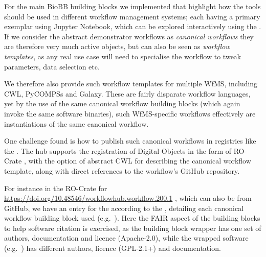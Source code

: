 For the main BioBB building blocks we implemented
 that highlight how the tools should be used in different
workflow management systems; each having a primary exemplar using
Jupyter Notebook, which can be explored interactively using the
. If
we consider the abstract demonstrator workflows as \emph{canonical
workflows} they are therefore very much active objects, but can also be
seen as \emph{workflow templates}, as any real use case will need to
specialise the workflow to tweak parameters, data selection etc.

We therefore also provide such workflow templates for multiple WfMS,
including CWL, PyCOMPSs and Galaxy. These are fairly disparate workflow
languages, yet by the use of the same canonical workflow building blocks
(which again invoke the same software binaries), such WfMS-specific
workflows effectively are instantiations of the same canonical workflow.

One challenge found is how to publish such canonical workflows in
registries like the . The hub
supports the registration of Digital Objects in the form of RO-Crate
\cite{Soiland-Reyes 2022}, with the option of abstract CWL for describing the canonical
workflow template, along with direct references to the workflow's GitHub
repository.

For instance in the RO-Crate for
\url{https://doi.org/10.48546/workflowhub.workflow.200.1} \cite{ch6-26},
which can also be
from GitHub, we have an entry for the
\emph{} according to the
, detailing each canonical workflow building block used
(e.g.~). Here the FAIR aspect of the building blocks to help software
citation is exercised, as the building block wrapper has one set of
authors, documentation and licence (Apache-2.0), while the wrapped
software
(e.g.~) has different authors, licence (GPL-2.1+) and documentation.

